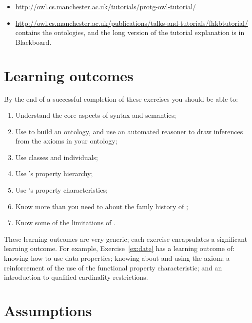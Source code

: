 \begin{itemize}
\item \url{http://owl.cs.manchester.ac.uk/tutorials/protg-owl-tutorial/}
\item \url{http://owl.cs.manchester.ac.uk/publications/talks-and-tutorials/fhkbtutorial/} contains the ontologies, and the long version of the tutorial explanation is in Blackboard. 
\end{itemize}

\section{Learning outcomes}

By the end of a successful completion of these exercises you should be able to:

\begin{enumerate}
\item Understand the core aspects of \owlii syntax and semantics;
\item Use \protege to build an ontology, and use an automated reasoner to draw inferences from the axioms in your ontology;
\item Use classes and individuals;
\item Use \owlii's property hierarchy;
\item Use \owlii's property characteristics;
\item Know more than you need to about the famly history of \rds;
\item Know some of the limitations of \owlii.
\end{enumerate}
\noindent These learning outcomes are very generic; each exercise encapsulates a significant learning outcome. For example, Exercise~\ref{ex:date} has a learning outcome of: knowing how to use data properties; knowing about and using the  axiom; a reinforcement of the use of the functional property characteristic; and an introduction to qualified cardinality restrictions.

\section{Assumptions}


